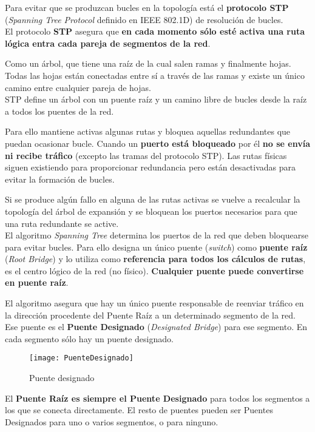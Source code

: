 \documentclass[10pt,portrait, twocolumn]{article}
\begin{document}
\quad Para evitar que se produzcan bucles en la topología está el \textbf{protocolo STP} (\textit{Spanning Tree Protocol} definido en IEEE 802.1D) de resolución de bucles.\\

El protocolo \textbf{STP} asegura que \textbf{en cada momento sólo esté activa una ruta lógica entra cada pareja de segmentos de la red}.

\quad Como un árbol, que tiene una raíz de la cual salen ramas y finalmente hojas. Todas las hojas están conectadas entre sí a través de las ramas y existe un único camino entre cualquier pareja de hojas.\\

STP define un árbol con un puente raíz y un camino libre de bucles desde la raíz a todos los puentes de la red. 

\quad Para ello mantiene activas algunas rutas y bloquea aquellas redundantes que puedan ocasionar bucle. Cuando un \textbf{puerto está bloqueado} por él \textbf{no se envía ni recibe tráfico} (excepto las tramas del protocolo STP). Las rutas físicas siguen existiendo para proporcionar redundancia pero están desactivadas para evitar la formación de bucles. 

\quad Si se produce algún fallo en alguna de las rutas activas se vuelve a recalcular la topología del árbol de expansión y se bloquean los puertos necesarios para que una ruta redundante se active.\\

El algoritmo \textit{Spanning Tree} determina los puertos de la red que deben bloquearse para evitar bucles. Para ello designa un único puente (\textit{switch}) como \textbf{puente raíz} (\textit{Root Bridge}) y lo utiliza como \textbf{referencia para todos los cálculos de rutas}, es el centro lógico de la red (no físico). \textbf{Cualquier puente puede convertirse en puente raíz}.

\quad El algoritmo asegura que hay un único puente responsable de reenviar tráfico en la dirección procedente del Puente Raíz a un determinado segmento de la red. Ese puente es el \textbf{Puente Designado} (\textit{Designated Bridge}) para ese segmento. En cada segmento sólo hay un puente designado.

\begin{figure}[!ht]	
	\centering
    	\texttt{[image: PuenteDesignado]}
	\caption{Puente designado}
\end{figure} 


El \textbf{Puente Raíz es siempre el Puente Designado} para todos los segmentos a los que se conecta directamente. El resto de puentes pueden ser Puentes Designados para uno o varios segmentos, o para ninguno.\\
\end{document}

